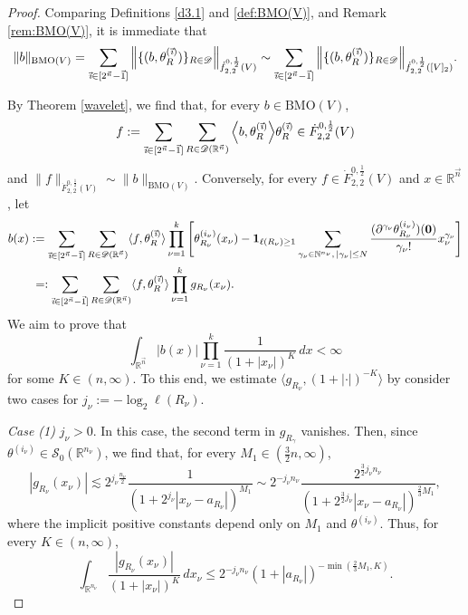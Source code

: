 \documentclass[11pt, reqno]{amsart}
\theoremstyle{definition}
\theoremstyle{remark}
\numberwithin{equation}{section}
\newcommand{\vone}{\vec 1}
\newcommand{\vi}{\vec{\textit{\i}}}
\newcommand{\vn}{\vec n}
\newcommand{\Norm}[2]{\|#1\|_{#2}}
\newcommand{\BNorm}[2]{\Big\|#1\Big\|_{#2}}
\begin{document}
\begin{proof}
Comparing Definitions \ref{d3.1} and \ref{def:BMO(V)}, and Remark \ref{rem:BMO(V)}, it is immediate that
\begin{equation}\label{eq:BMO(V)=f}
  \Norm{b}{\operatorname{BMO}(V)}
  =\sum_{\vi\in[2^{\vn}-\vone]}\BNorm{\{(b,\theta_R^{(\vi)})\}_{R\in\mathscr D}}{\dot f^{0,\frac12}_{2,2}(V)}
  \sim\sum_{\vi\in[2^{\vn}-\vone]}\BNorm{\{(b,\theta_R^{(\vi)})\}_{R\in\mathscr D}}{\dot f^{0,\frac12}_{2,2}([V]_2)}.
\end{equation}

By Theorem \ref{wavelet}, we find that,
for every $b\in \mathrm{BMO}(V)$,
$$
f:=\sum_{\vi\in[2^{\vec n}-\vec 1]}
\sum_{R\in \mathscr D(\mathbb R^{\vec n})}
\Big\langle b,\theta^{(\vi)}_R\Big\rangle \theta^{(\vi)}_R
\in \dot F^{0,\frac12}_{2,2}(V)
$$
and $\|f\|_{\dot F^{0,\frac12}_{2,2}(V)}\sim \|b\|_{\mathrm{BMO}(V)}$.
Conversely, for every $f\in \dot F^{0,\frac12}_{2,2}(V)$ and $x\in\mathbb R^{\vec n}$, let
\begin{equation*}
\begin{split}
b(x)
&:=\sum_{\vi\in[2^{\vec n}-\vec 1]}
\sum_{R\in \mathscr D(\mathbb R^{\vec n})}
\langle f, \theta^{(\vi)}_R\rangle
\prod_{\nu=1}^k \Bigg[\theta^{(i_\nu)}_{R_\nu}(x_\nu)
-\mathbf{1}_{\ell(R_\nu)\geq 1}\sum_{\gamma_\nu\in\mathbb N^{n_\nu},\,|\gamma_\nu|\leq N}
\frac{( \partial^{\gamma_\nu} \theta^{(i_\nu)}_{R_\nu})(\mathbf 0)}{\gamma_\nu!}  x_\nu^{\gamma_\nu}\Bigg]\\
&\phantom{:}=:\sum_{\vi\in[2^{\vec n}-\vec 1]}
\sum_{R\in \mathscr D(\mathbb R^{\vec n})}
\langle f, \theta^{(\vi)}_R\rangle
\prod_{\nu=1}^k g_{R_\nu}(x_\nu).
\end{split}
\end{equation*}
We aim to prove that
\begin{equation}\label{int<infty}
\int_{\mathbb R^{\vec n}} |b(x)| \prod_{\nu=1}^k \frac{1}{(1+|x_\nu|)^K}\,dx
<\infty
\end{equation}
for some $K\in(n,\infty)$. To this end, we estimate
$\langle g_{R_\nu}, (1+|\cdot|)^{-K}\rangle$
by consider two cases for $j_\nu:=-\log_2 \ell(R_\nu)$.

\emph{Case (1)} $j_\nu> 0$. In this case, the second term in $g_{R_\gamma}$ vanishes.
Then, since $\theta^{(i_\nu)}\in\mathscr S_0(\mathbb R^{n_\nu})$, we find that, for every $M_1\in (\frac32n,\infty)$,
\begin{equation*}
  |g_{R_\nu}(x_\nu)|
  \lesssim 2^{j_\nu \frac{n_\nu}2} \frac{1}{(1+2^{j_\nu}|x_\nu-a_{R_\nu}|)^{M_1}}
  \sim 2^{-j_\nu n_\nu} \frac{2^{\frac32 j_\nu  n_\nu}}{(1+2^{\frac32j_\nu}|x_\nu-a_{R_\nu}|)^{\frac23M_1}},
\end{equation*}
where the implicit positive constants depend only on $M_1$ and $\theta^{(i_\nu)}$.
Thus, for every $K\in(n,\infty)$,
\begin{equation}\label{j>0}
\int_{\mathbb R^{n_\nu}} \frac{|g_{R_\nu}(x_\nu)|}{(1+|x_\nu|)^K} \,dx_\nu
\leq 2^{-j_\nu n_\nu} (1+|a_{R_\nu}|)^{-\min(\frac23M_1,K)}.
\end{equation}


\end{proof}
\end{document}
